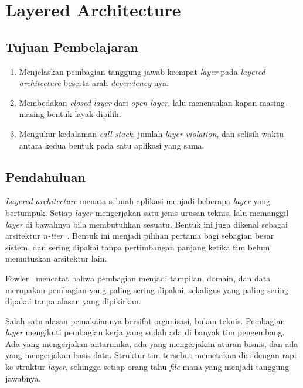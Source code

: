 \chapter{Layered Architecture}
\label{bab:lapisan}

\section*{Tujuan Pembelajaran}

\begin{enumerate}
  \item Menjelaskan pembagian tanggung jawab keempat \textit{layer} pada
    \textit{layered architecture} beserta arah \textit{dependency}-nya.
  \item Membedakan \textit{closed layer} dari \textit{open layer}, lalu menentukan kapan
    masing-masing bentuk layak dipilih.
  \item Mengukur kedalaman \textit{call stack}, jumlah \textit{layer
    violation}, dan selisih waktu antara kedua bentuk pada satu aplikasi yang
    sama.
\end{enumerate}

\section{Pendahuluan}

\textit{Layered architecture}
menata sebuah aplikasi menjadi beberapa \textit{layer}
yang bertumpuk. Setiap \textit{layer} mengerjakan satu jenis urusan teknis, lalu
memanggil \textit{layer} di bawahnya bila membutuhkan sesuatu. Bentuk ini juga dikenal
sebagai arsitektur \textit{n-tier}~\cite{microsoft2024ntier}. Bentuk ini menjadi pilihan pertama bagi
sebagian besar sistem, dan sering dipakai tanpa pertimbangan panjang ketika tim
belum memutuskan arsitektur lain.

Fowler~\cite{fowler2015layering} mencatat bahwa pembagian menjadi tampilan,
domain, dan data merupakan pembagian yang paling sering dipakai, sekaligus yang
paling sering dipakai tanpa alasan yang dipikirkan.

Salah satu alasan pemakaiannya bersifat organisasi, bukan teknis. Pembagian
\textit{layer} mengikuti pembagian kerja yang sudah ada di banyak tim pengembang. Ada
yang mengerjakan antarmuka, ada yang mengerjakan aturan bisnis, dan ada yang
mengerjakan basis data. Struktur tim tersebut memetakan diri dengan rapi ke
struktur \textit{layer}, sehingga setiap orang tahu \textit{file} mana yang menjadi
tanggung jawabnya.

